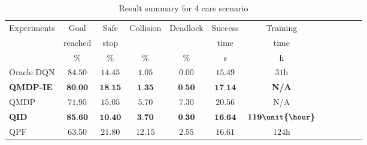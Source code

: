 \begin{table}[!h]
\caption{Result summary for 4 cars scenario}
\label{tab:results_summary}
\begin{tabularx}{\columnwidth}{@{}l*{10}{c}c@{}}
\toprule
Experiments     & Goal    & Safe & Collision & Deadlock & Success & Training \\ 
                & reached & stop &           &          &  time   & time\\ 
     & $\%$ & $\%$ & $\%$ & $\%$ & s & h\\ 
\midrule
Oracle DQN    & $84.50$ & $14.45$ & $1.05$ & $0.00$ & $15.49$ & $31\unit{\hour}$ \\ %
\textbf{QMDP-IE}   & $\textbf{80.00}$ & $\textbf{18.15}$ & $\textbf{1.35}$ & $\textbf{0.50}$ & $\textbf{17.14}$ & \textbf{N/A} \\ 
QMDP      & $71.95$ & $15.05$ & $5.70$ & $7.30$ & $20.56$ & N/A\\ 
\textbf{QID}       & $\textbf{85.60}$ & $\textbf{10.40}$ & $\textbf{3.70}$ & $\textbf{0.30}$ & $\textbf{16.64}$ & $\textbf{119\unit{\hour}}$ \\ %
QPF       & $63.50$ & $21.80$ & $12.15$ & $2.55$ & $16.61$ & $124\unit{\hour}$ \\ %

\bottomrule
\end{tabularx}
\end{table}


